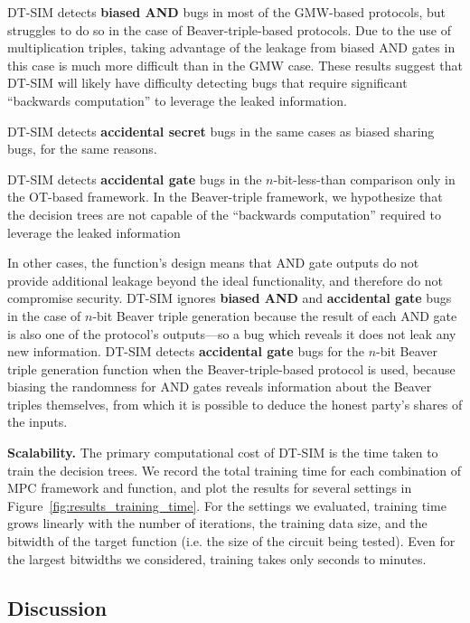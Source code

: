 \documentclass[compsoc, conference, a4paper, 10pt, times]{IEEEtran}
\renewcommand{\paragraph}[1]{\vspace*{2pt}\noindent\textbf{#1}}
\newcommand{\toolname}{\textsc{DT-SIM}\xspace}
\begin{document}
\toolname detects \textbf{biased AND} bugs in most of the GMW-based protocols, but struggles to do so in the case of Beaver-triple-based protocols. Due to the use of multiplication triples, taking advantage of the leakage from biased AND gates in this case is much more difficult than in the GMW case. These results suggest that \toolname will likely have difficulty detecting bugs that require significant ``backwards computation'' to leverage the leaked information.

\toolname detects \textbf{accidental secret} bugs in the same cases as biased sharing bugs, for the same reasons.

\toolname detects \textbf{accidental gate} bugs in the $n$-bit-less-than comparison only in the OT-based framework.
In the Beaver-triple framework, we hypothesize that the decision trees are not capable of the ``backwards computation''
required to leverage the leaked information

In other cases, the function's design means that AND gate outputs do not provide additional leakage beyond the ideal functionality,
and therefore do not compromise security.
\toolname ignores \textbf{biased AND} and \textbf{accidental gate} bugs in the case of $n$-bit Beaver triple generation
because the result of each AND gate is also one of the protocol's outputs---so a bug which reveals it does not leak any new information.
\toolname detects \textbf{accidental gate} bugs for the $n$-bit Beaver triple generation function when the Beaver-triple-based protocol is used, because biasing the randomness for AND gates reveals information about the Beaver triples themselves, from which it is possible to deduce the honest party's shares of the inputs.


\paragraph{Scalability.}
The primary computational cost of \toolname is the time taken to train the decision trees. We record the total training time for each combination of MPC framework and function, and plot the results for several settings in Figure~\ref{fig:results_training_time}. For the settings we evaluated, training time grows linearly with the number of iterations, the training data size, and the bitwidth of the target function (i.e. the size of the circuit being tested). Even for the largest bitwidths we considered, training takes only seconds to minutes.

\subsection{Discussion}
\end{document}
